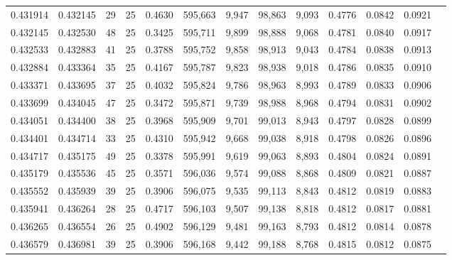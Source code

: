 \begin{tabular}{rrrrrrrrrrrrr}
0.431914 & 0.432145 &    29 &  25 &                                     0.4630 & 595,663 &   9,947 &  98,863 &   9,093 & 0.4776 & 0.0842 & 0.0921 \\
0.432145 & 0.432530 &    48 &  25 &                                     0.3425 & 595,711 &   9,899 &  98,888 &   9,068 & 0.4781 & 0.0840 & 0.0917 \\
0.432533 & 0.432883 &    41 &  25 &                                     0.3788 & 595,752 &   9,858 &  98,913 &   9,043 & 0.4784 & 0.0838 & 0.0913 \\
0.432884 & 0.433364 &    35 &  25 &                                     0.4167 & 595,787 &   9,823 &  98,938 &   9,018 & 0.4786 & 0.0835 & 0.0910 \\
0.433371 & 0.433695 &    37 &  25 &                                     0.4032 & 595,824 &   9,786 &  98,963 &   8,993 & 0.4789 & 0.0833 & 0.0906 \\
0.433699 & 0.434045 &    47 &  25 &                                     0.3472 & 595,871 &   9,739 &  98,988 &   8,968 & 0.4794 & 0.0831 & 0.0902 \\
0.434051 & 0.434400 &    38 &  25 &                                     0.3968 & 595,909 &   9,701 &  99,013 &   8,943 & 0.4797 & 0.0828 & 0.0899 \\
0.434401 & 0.434714 &    33 &  25 &                                     0.4310 & 595,942 &   9,668 &  99,038 &   8,918 & 0.4798 & 0.0826 & 0.0896 \\
0.434717 & 0.435175 &    49 &  25 &                                     0.3378 & 595,991 &   9,619 &  99,063 &   8,893 & 0.4804 & 0.0824 & 0.0891 \\
0.435179 & 0.435536 &    45 &  25 &                                     0.3571 & 596,036 &   9,574 &  99,088 &   8,868 & 0.4809 & 0.0821 & 0.0887 \\
0.435552 & 0.435939 &    39 &  25 &                                     0.3906 & 596,075 &   9,535 &  99,113 &   8,843 & 0.4812 & 0.0819 & 0.0883 \\
0.435941 & 0.436264 &    28 &  25 &                                     0.4717 & 596,103 &   9,507 &  99,138 &   8,818 & 0.4812 & 0.0817 & 0.0881 \\
0.436265 & 0.436554 &    26 &  25 &                                     0.4902 & 596,129 &   9,481 &  99,163 &   8,793 & 0.4812 & 0.0814 & 0.0878 \\
0.436579 & 0.436981 &    39 &  25 &                                     0.3906 & 596,168 &   9,442 &  99,188 &   8,768 & 0.4815 & 0.0812 & 0.0875 \\

\end{tabular}
